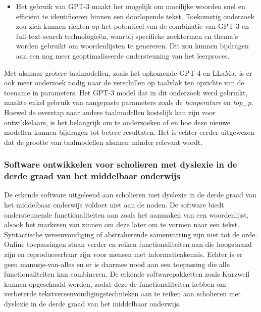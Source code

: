 \begin{itemize}
	\item Het gebruik van GPT-3 maakt het mogelijk om moeilijke woorden snel en efficiënt te identificeren binnen een doorlopende tekst. Toekomstig onderzoek zou zich kunnen richten op het potentieel van de combinatie van GPT-3 en full-text-search technologieën, waarbij specifieke zoektermen en thema's worden gebruikt om woordenlijsten te genereren. Dit zou kunnen bijdragen aan een nog meer geoptimaliseerde ondersteuning van het leerproces.
\end{itemize}

Met alsmaar grotere taalmodellen, zoals het opkomende GPT-4 en LLaMa, is er ook meer onderzoek nodig naar de verschillen op taalvlak ten opzichte van de toename in parameters. Het GPT-3 model dat in dit onderzoek werd gebruikt, maakte enkel gebruik van aangepaste parameters zoals de \textit{temperature} en \textit{top\_p}. Hoewel de overstap naar andere taalmodellen kostelijk kan zijn voor ontwikkelaars, is het belangrijk om te onderzoeken of en hoe deze nieuwe modellen kunnen bijdragen tot betere resultaten. Het is echter eerder uitgewezen dat de grootte van taalmodellen alsmaar minder relevant wordt. 


\subsubsection{Software ontwikkelen voor scholieren met dyslexie in de derde graad van het middelbaar onderwijs}

De erkende software uitgeleend aan scholieren met dyslexie in de derde graad van het middelbaar onderwijs voldoet niet aan de noden. De software biedt ondersteunende functionaliteiten aan zoals het aanmaken van een woordenlijst, alsook het markeren van zinnen om deze later om te vormen naar een tekst. Syntactische vereenvoudiging of abstraherende samenvatting zijn niet tot de orde. Online toepassingen staan verder en reiken functionaliteiten aan die hoogstaand zijn en reproduceerbaar zijn voor mensen met informaticakennis. Echter is er geen manusje-van-alles en er is daarmee nood aan een toepassing die alle functionaliteiten kan combineren. De erkende softwarepakketten zoals Kurzweil kunnen opgeschaald worden, zodat deze de functionaliteiten hebben om verbeterde tekstvereenvoudigingstechnieken aan te reiken aan scholieren met dyslexie in de derde graad van het middelbaar onderwijs. 

\medspace


